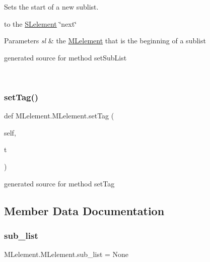 Sets the start of a new sublist. 

to the \hyperlink{namespace_s_lelement}{S\+Lelement} \char`\"{}next\char`\"{}


\begin{DoxyParams}{Parameters}
{\em sl} & the \hyperlink{class_m_lelement_1_1_m_lelement}{M\+Lelement} that is the beginning of a sublist\begin{DoxyVerb}generated source for method setSubList \end{DoxyVerb}
 \\
\hline
\end{DoxyParams}
\hypertarget{class_m_lelement_1_1_m_lelement_a76d2c74303e1d8d33adb4670aafaf0de}{}\label{class_m_lelement_1_1_m_lelement_a76d2c74303e1d8d33adb4670aafaf0de} 
\subsubsection{\texorpdfstring{set\+Tag()}{setTag()}}
{\footnotesize\ttfamily def M\+Lelement.\+M\+Lelement.\+set\+Tag (\begin{DoxyParamCaption}\item[{}]{self,  }\item[{}]{t }\end{DoxyParamCaption})}

\begin{DoxyVerb}generated source for method setTag \end{DoxyVerb}
 

\subsection{Member Data Documentation}
\hypertarget{class_m_lelement_1_1_m_lelement_a03b2df3aa731f864b628ff60dda11a30}{}\label{class_m_lelement_1_1_m_lelement_a03b2df3aa731f864b628ff60dda11a30} 
\subsubsection{\texorpdfstring{sub\+\_\+list}{sub\_list}}
{\footnotesize\ttfamily M\+Lelement.\+M\+Lelement.\+sub\+\_\+list = None\hspace{0.3cm}{\ttfamily [static]}}

